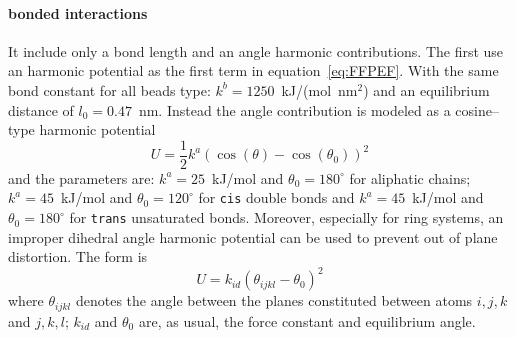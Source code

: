 \paragraph{\textbf{bonded interactions}} It include only a bond length and an angle harmonic contributions. The first use an harmonic potential as the first term in equation~\eqref{eq:FFPEF}. With the same bond constant for all beads type: $k^b = 1250$~kJ/(mol\ nm$^2$) and an equilibrium distance of $l_0 = 0.47$~nm. Instead the angle contribution is modeled as a cosine--type harmonic potential
\begin{equation*}
	U = \frac{1}{2}k^a (\cos(\theta) - \cos(\theta_0))^2
\end{equation*}
and the parameters are: $k^a = 25$~kJ/mol and $\theta_0 = 180^\circ$ for aliphatic chains; $k^a = 45$~kJ/mol and $\theta_0 = 120^\circ$ for \texttt{cis} double bonds and $k^a = 45$~kJ/mol and $\theta_0 = 180^\circ$ for \texttt{trans} unsaturated bonds. Moreover, especially for ring systems, an improper dihedral angle harmonic potential can be used to prevent out of plane distortion. The form is
\begin{equation*}
	U = k_{id} (\theta_{ijkl} - \theta_0)^2
\end{equation*}
where $\theta_{ijkl}$ denotes the angle between the planes constituted between atoms $i,j,k$ and $j,k,l$; $k_{id}$ and $\theta_0$ are, as usual, the force constant and equilibrium angle.

